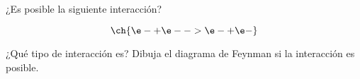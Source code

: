 \documentclass[./../main.tex]{subfiles}
\begin{document}
    \begin{exercise}
        ¿Es posible la siguiente interacción?

        \begin{equation*}
            \ch{\e- + \e- -> \e- + \e-}
        \end{equation*}

        ¿Qué tipo de interacción es? Dibuja el diagrama de Feynman si la interacción es posible.
    \end{exercise}
\end{document}
